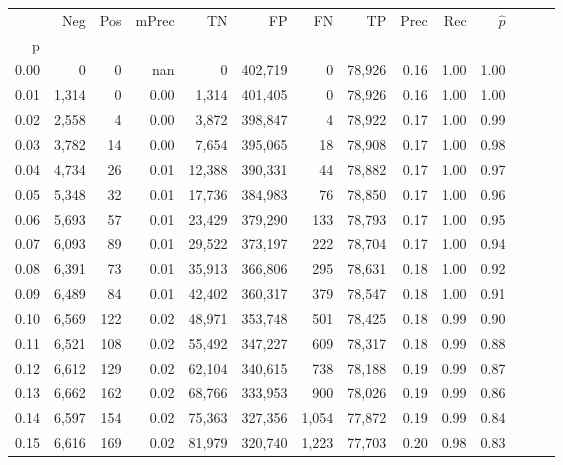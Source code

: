 \begin{tabular}{rrrrrrrrrrrrrr}
\toprule
{} &    Neg &    Pos & mPrec &       TN &       FP &      FN &      TP &  Prec &   Rec & $\hat{p}$ \\
p    &        &        &       &          &          &         &         &       &       &           \\
\midrule
0.00 &      0 &      0 &   nan &        0 &  402,719 &       0 &  78,926 &  0.16 &  1.00 &      1.00 \\
0.01 &  1,314 &      0 &  0.00 &    1,314 &  401,405 &       0 &  78,926 &  0.16 &  1.00 &      1.00 \\
0.02 &  2,558 &      4 &  0.00 &    3,872 &  398,847 &       4 &  78,922 &  0.17 &  1.00 &      0.99 \\
0.03 &  3,782 &     14 &  0.00 &    7,654 &  395,065 &      18 &  78,908 &  0.17 &  1.00 &      0.98 \\
0.04 &  4,734 &     26 &  0.01 &   12,388 &  390,331 &      44 &  78,882 &  0.17 &  1.00 &      0.97 \\
0.05 &  5,348 &     32 &  0.01 &   17,736 &  384,983 &      76 &  78,850 &  0.17 &  1.00 &      0.96 \\
0.06 &  5,693 &     57 &  0.01 &   23,429 &  379,290 &     133 &  78,793 &  0.17 &  1.00 &      0.95 \\
0.07 &  6,093 &     89 &  0.01 &   29,522 &  373,197 &     222 &  78,704 &  0.17 &  1.00 &      0.94 \\
0.08 &  6,391 &     73 &  0.01 &   35,913 &  366,806 &     295 &  78,631 &  0.18 &  1.00 &      0.92 \\
0.09 &  6,489 &     84 &  0.01 &   42,402 &  360,317 &     379 &  78,547 &  0.18 &  1.00 &      0.91 \\
0.10 &  6,569 &    122 &  0.02 &   48,971 &  353,748 &     501 &  78,425 &  0.18 &  0.99 &      0.90 \\
0.11 &  6,521 &    108 &  0.02 &   55,492 &  347,227 &     609 &  78,317 &  0.18 &  0.99 &      0.88 \\
0.12 &  6,612 &    129 &  0.02 &   62,104 &  340,615 &     738 &  78,188 &  0.19 &  0.99 &      0.87 \\
0.13 &  6,662 &    162 &  0.02 &   68,766 &  333,953 &     900 &  78,026 &  0.19 &  0.99 &      0.86 \\
0.14 &  6,597 &    154 &  0.02 &   75,363 &  327,356 &   1,054 &  77,872 &  0.19 &  0.99 &      0.84 \\
0.15 &  6,616 &    169 &  0.02 &   81,979 &  320,740 &   1,223 &  77,703 &  0.20 &  0.98 &      0.83 \\

\end{tabular}

